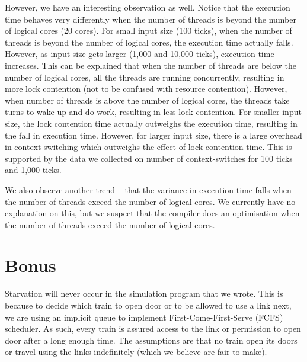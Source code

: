 \documentclass[a4paper,12pt]{article}
\begin{document}
However, we have an interesting observation as well. Notice that the execution time behaves very differently when the number of threads is beyond the number of logical cores (20 cores). For small input size (100 ticks), when the number of threads is beyond the number of logical cores, the execution time actually falls. However, as input size gets larger (1,000 and 10,000 ticks), execution time increases. This can be explained that when the number of threads are below the number of logical cores, all the threads are running concurrently, resulting in more lock contention (not to be confused with resource contention). However, when number of threads is above the number of logical cores, the threads take turns to wake up and do work, resulting in less lock contention. For smaller input size, the lock contention time actually outweighs the execution time, resulting in the fall in execution time. However, for larger input size, there is a large overhead in context-switching which outweighs the effect of lock contention time. This is supported by the data we collected on number of context-switches for 100 ticks and 1,000 ticks.

We also observe another trend -- that the variance in execution time falls when the number of threads exceed the number of logical cores. We currently have no explanation on this, but we suspect that the compiler does an optimisation when the number of threads exceed the number of logical cores.


\section{Bonus}
Starvation will never occur in the simulation program that we wrote. This is because to decide which train to open door or to be allowed to use a link next, we are using an implicit queue to implement First-Come-First-Serve (FCFS) scheduler. As such, every train is assured access to the link or permission to open door after a long enough time. The assumptions are that no train open its doors or travel using the links indefinitely (which we believe are fair to make).
\end{document}
